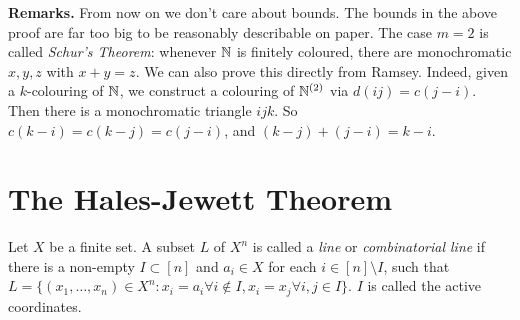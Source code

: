 \documentclass[10pt,a4paper]{article}
\begin{document}
\textbf{Remarks.} From now on we don't care about bounds. The bounds in the above proof are far too big to be reasonably describable on paper. The case $m=2$ is called \emph{Schur's Theorem}: whenever $\mathbb{N}$ is finitely coloured, there are monochromatic $x, y, z$ with $x+y=z$. We can also prove this directly from Ramsey. Indeed, given a $k$-colouring of $\mathbb{N}$, we construct a colouring of $\mathbb{N}^{(2)}$ via $d(ij) = c(j-i)$. Then there is a monochromatic triangle $ijk$. So $c(k-i) = c(k-j) = c(j-i)$, and $(k-j) + (j-i) = k-i$.
\section{The Hales-Jewett Theorem}
Let $X$ be a finite set. A subset $L$ of $X^n$ is called a \emph{line} or \emph{combinatorial line} if there is a non-empty $I \subset [n]$ and $a_i \in X$ for each $i \in [n]\setminus I$, such that $L = \{(x_1, \ldots, x_n) \in X^n: x_i = a_i \forall i \notin I, x_i=x_j \forall i,j \in I\}$. $I$ is called the active coordinates.
\end{document}
